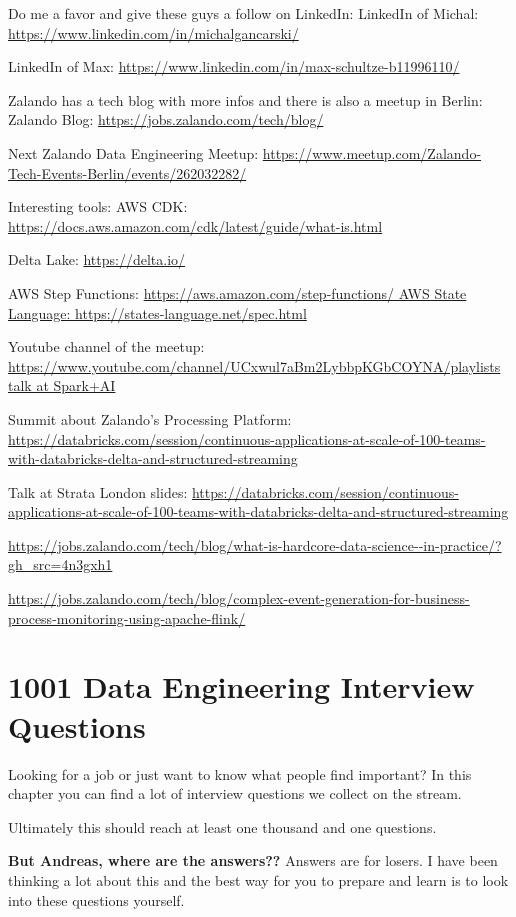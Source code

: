 \documentclass[12pt, numbers=noenddot]{scrreprt} %
\begin{document}
Do me a favor and give these guys a follow on LinkedIn:
LinkedIn of Michal: \url{https://www.linkedin.com/in/michalgancarski/}

LinkedIn of Max: \url{https://www.linkedin.com/in/max-schultze-b11996110/}

Zalando has a tech blog with more infos and there is also a meetup in Berlin:
Zalando Blog: 
\url{https://jobs.zalando.com/tech/blog/}

Next Zalando Data Engineering Meetup: 
\url{https://www.meetup.com/Zalando-Tech-Events-Berlin/events/262032282/}

Interesting tools:
AWS CDK: 
\url{https://docs.aws.amazon.com/cdk/latest/guide/what-is.html}

Delta Lake: 
\url{https://delta.io/} 

AWS Step Functions: 
\url{https://aws.amazon.com/step-functions/ AWS State Language: https://states-language.net/spec.html} 

Youtube channel of the meetup: 
\url{https://www.youtube.com/channel/UCxwul7aBm2LybbpKGbCOYNA/playlists talk at Spark+AI} 

Summit about Zalando's Processing Platform: 
\url{https://databricks.com/session/continuous-applications-at-scale-of-100-teams-with-databricks-delta-and-structured-streaming} 

Talk at Strata London slides: 
\url{https://databricks.com/session/continuous-applications-at-scale-of-100-teams-with-databricks-delta-and-structured-streaming}


\url{https://jobs.zalando.com/tech/blog/what-is-hardcore-data-science--in-practice/?gh_src=4n3gxh1}

\url{https://jobs.zalando.com/tech/blog/complex-event-generation-for-business-process-monitoring-using-apache-flink/}



\part{1001 Data Engineering Interview Questions}

Looking for a job or just want to know what people find important?
In this chapter you can find a lot of interview questions we collect on the stream. 

Ultimately this should reach at least one thousand and one questions.

\textbf{But Andreas, where are the answers??}
Answers are for losers. I have been thinking a lot about this and the best way for you to prepare and learn is to look into these questions yourself.
\end{document}
